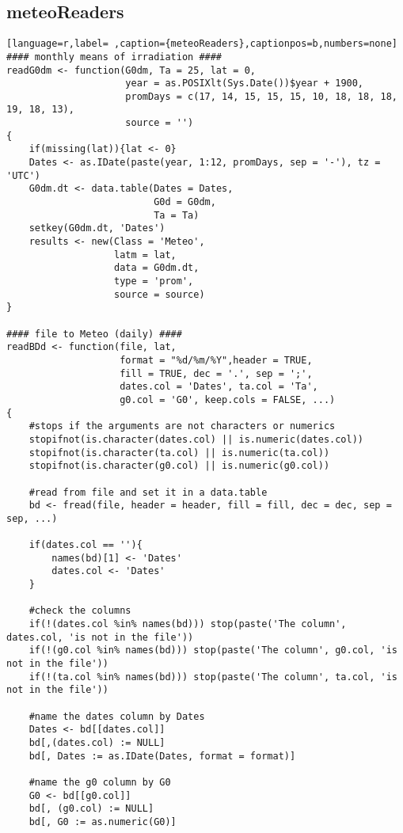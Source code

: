 \subsection{meteoReaders}
\label{sec:orgb336e2a}
\label{subsec:meteoreaders}
\begin{lstlisting}[language=r,label= ,caption={meteoReaders},captionpos=b,numbers=none]
#### monthly means of irradiation ####
readG0dm <- function(G0dm, Ta = 25, lat = 0,
                     year = as.POSIXlt(Sys.Date())$year + 1900,
                     promDays = c(17, 14, 15, 15, 15, 10, 18, 18, 18, 19, 18, 13),
                     source = '')
{
    if(missing(lat)){lat <- 0}
    Dates <- as.IDate(paste(year, 1:12, promDays, sep = '-'), tz = 'UTC')
    G0dm.dt <- data.table(Dates = Dates,
                          G0d = G0dm,
                          Ta = Ta)
    setkey(G0dm.dt, 'Dates')
    results <- new(Class = 'Meteo',
                   latm = lat,
                   data = G0dm.dt,
                   type = 'prom',
                   source = source)
}

#### file to Meteo (daily) ####
readBDd <- function(file, lat,
                    format = "%d/%m/%Y",header = TRUE,
                    fill = TRUE, dec = '.', sep = ';',
                    dates.col = 'Dates', ta.col = 'Ta',
                    g0.col = 'G0', keep.cols = FALSE, ...)
{
    #stops if the arguments are not characters or numerics
    stopifnot(is.character(dates.col) || is.numeric(dates.col))
    stopifnot(is.character(ta.col) || is.numeric(ta.col))
    stopifnot(is.character(g0.col) || is.numeric(g0.col))

    #read from file and set it in a data.table
    bd <- fread(file, header = header, fill = fill, dec = dec, sep = sep, ...)

    if(dates.col == ''){
        names(bd)[1] <- 'Dates'
        dates.col <- 'Dates'
    }

    #check the columns
    if(!(dates.col %in% names(bd))) stop(paste('The column', dates.col, 'is not in the file'))
    if(!(g0.col %in% names(bd))) stop(paste('The column', g0.col, 'is not in the file'))
    if(!(ta.col %in% names(bd))) stop(paste('The column', ta.col, 'is not in the file'))

    #name the dates column by Dates
    Dates <- bd[[dates.col]]
    bd[,(dates.col) := NULL]
    bd[, Dates := as.IDate(Dates, format = format)]

    #name the g0 column by G0
    G0 <- bd[[g0.col]]
    bd[, (g0.col) := NULL]
    bd[, G0 := as.numeric(G0)]


\end{lstlisting}
